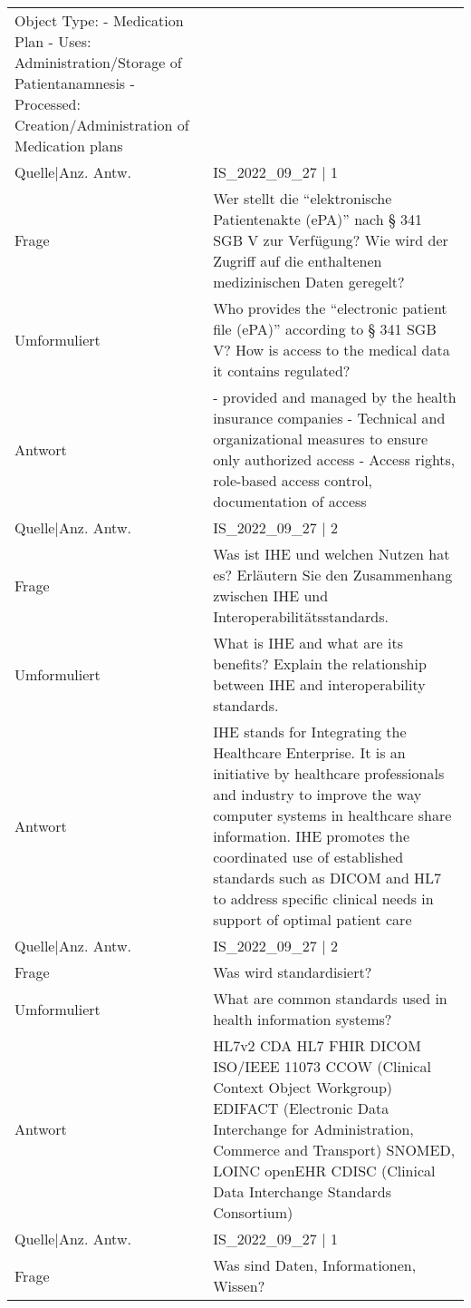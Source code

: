 {\begin{landscape}
\begin{longtable}{p{3cm}p{}}
    Object Type:
    - Medication Plan
        - Uses: Administration/Storage of Patientanamnesis
        - Processed: Creation/Administration of Medication plans \\
    Quelle|Anz. Antw. &  IS\_2022\_09\_27  | 1 \\
    \midrule
    Frage & Wer stellt die ``elektronische Patientenakte (ePA)'' nach § 341 SGB V zur Verfügung? Wie wird der Zugriff auf die enthaltenen medizinischen Daten geregelt? \\
    Umformuliert & Who provides the ``electronic patient file (ePA)'' according to § 341 SGB V? How is access to the medical data it contains regulated? \\
    Antwort & - provided and managed by the health insurance companies
    - Technical and organizational measures to ensure only authorized access
    - Access rights, role-based access control, documentation of access \\
    Quelle|Anz. Antw. &  IS\_2022\_09\_27  | 2 \\
    \midrule
    Frage & Was ist IHE und welchen Nutzen hat es? Erläutern Sie den Zusammenhang zwischen IHE und Interoperabilitätsstandards.\\
    Umformuliert & What is IHE and what are its benefits? Explain the relationship between IHE and interoperability standards.\\
    Antwort & IHE stands for Integrating the Healthcare Enterprise.
    It is an initiative by healthcare professionals and industry to improve the way computer systems in healthcare share information.
    IHE promotes the coordinated use of established standards such as DICOM and HL7 to address specific clinical needs in support of optimal patient care \\
    Quelle|Anz. Antw. &  IS\_2022\_09\_27  | 2 \\
    \midrule
    Frage & Was wird standardisiert? \\
    Umformuliert & What are common standards used in health information systems? \\
    Antwort & HL7v2
    CDA
    HL7 FHIR
    DICOM
    ISO/IEEE 11073
    CCOW (Clinical Context Object Workgroup)
    EDIFACT (Electronic Data Interchange for Administration, Commerce and Transport)
    SNOMED, LOINC
    openEHR
    CDISC (Clinical Data Interchange Standards Consortium) \\
    Quelle|Anz. Antw. &  IS\_2022\_09\_27  | 1 \\
    \midrule
    Frage & Was sind Daten, Informationen, Wissen? \\

\end{longtable}
\end{landscape}}
